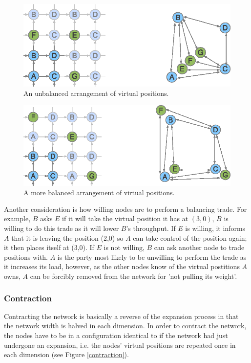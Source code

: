\documentclass[ %
                    author={Luke Murray},
                supervisor={Dr. Simon Hollis},
                     title={Shadow Peer-to-Peer Networks},
                  subtitle={},
                    degree={MEng},
                      year={2013} ]{thesis}
\begin{document}
\begin{figure}[h]
    \centering
    \includegraphics{diagrams/network_balance1.eps}
    \caption{An unbalanced arrangement of virtual positions.}
    \label{balance1}
\end{figure}
\begin{figure}[h]
    \centering
    \includegraphics{diagrams/network_balance2.eps}
    \caption{A more balanced arrangement of virtual positions.}
    \label{balance2}
\end{figure}

Another consideration is how willing nodes are to perform a balancing trade. For example, $B$ asks $E$ if it will take the virtual position it has at $(3,0)$, $B$ is willing to do this trade as it will lower $B$'s throughput. If $E$ is willing, it informs $A$ that it is leaving the position (2,0) so $A$ can take control of the position again; it then places itself at (3,0). If $E$ is not willing, $B$ can ask another node to trade positions with. $A$ is the party most likely to be unwilling to perform the trade as it increases its load, however, as the other nodes know of the virtual postitions $A$ owns, $A$ can be forcibly removed from the network for 'not pulling its weight'.

\subsubsection{Contraction}

Contracting the network is basically a reverse of the expansion process in that the network width is halved in each dimension. In order to contract the network, the nodes have to be in a configuration identical to if the network had just undergone an expansion, i.e. the nodes' virtual positions are repeated once in each dimension (see Figure \ref{contraction}).
\end{document}
